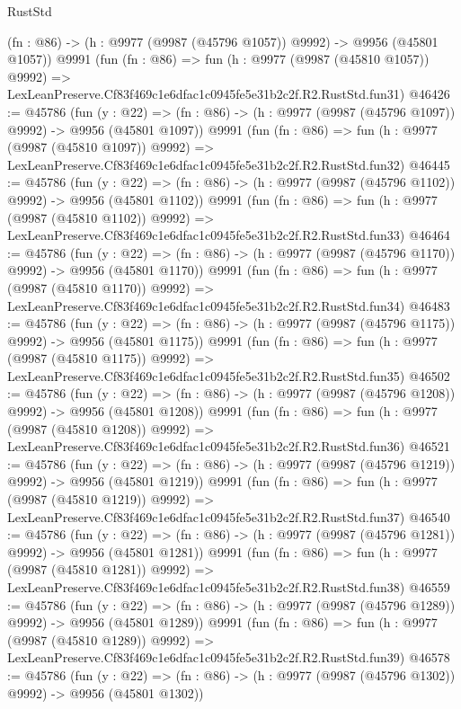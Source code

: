 \begin{lexlean}{RustStd}
\begin{coremodule}
    (fn : @86) -> (h : @9977 (@9987 (@45796 @1057)) @9992) -> @9956 (@45801 @1057))
    @9991
    (fun (fn : @86) =>
    fun (h : @9977 (@9987 (@45810 @1057)) @9992) =>
    LexLeanPreserve.Cf83f469c1e6dfac1c0945fe5e31b2c2f.R2.RustStd.fun31)
@46426 := @45786
    (fun (y : @22) =>
    (fn : @86) -> (h : @9977 (@9987 (@45796 @1097)) @9992) -> @9956 (@45801 @1097))
    @9991
    (fun (fn : @86) =>
    fun (h : @9977 (@9987 (@45810 @1097)) @9992) =>
    LexLeanPreserve.Cf83f469c1e6dfac1c0945fe5e31b2c2f.R2.RustStd.fun32)
@46445 := @45786
    (fun (y : @22) =>
    (fn : @86) -> (h : @9977 (@9987 (@45796 @1102)) @9992) -> @9956 (@45801 @1102))
    @9991
    (fun (fn : @86) =>
    fun (h : @9977 (@9987 (@45810 @1102)) @9992) =>
    LexLeanPreserve.Cf83f469c1e6dfac1c0945fe5e31b2c2f.R2.RustStd.fun33)
@46464 := @45786
    (fun (y : @22) =>
    (fn : @86) -> (h : @9977 (@9987 (@45796 @1170)) @9992) -> @9956 (@45801 @1170))
    @9991
    (fun (fn : @86) =>
    fun (h : @9977 (@9987 (@45810 @1170)) @9992) =>
    LexLeanPreserve.Cf83f469c1e6dfac1c0945fe5e31b2c2f.R2.RustStd.fun34)
@46483 := @45786
    (fun (y : @22) =>
    (fn : @86) -> (h : @9977 (@9987 (@45796 @1175)) @9992) -> @9956 (@45801 @1175))
    @9991
    (fun (fn : @86) =>
    fun (h : @9977 (@9987 (@45810 @1175)) @9992) =>
    LexLeanPreserve.Cf83f469c1e6dfac1c0945fe5e31b2c2f.R2.RustStd.fun35)
@46502 := @45786
    (fun (y : @22) =>
    (fn : @86) -> (h : @9977 (@9987 (@45796 @1208)) @9992) -> @9956 (@45801 @1208))
    @9991
    (fun (fn : @86) =>
    fun (h : @9977 (@9987 (@45810 @1208)) @9992) =>
    LexLeanPreserve.Cf83f469c1e6dfac1c0945fe5e31b2c2f.R2.RustStd.fun36)
@46521 := @45786
    (fun (y : @22) =>
    (fn : @86) -> (h : @9977 (@9987 (@45796 @1219)) @9992) -> @9956 (@45801 @1219))
    @9991
    (fun (fn : @86) =>
    fun (h : @9977 (@9987 (@45810 @1219)) @9992) =>
    LexLeanPreserve.Cf83f469c1e6dfac1c0945fe5e31b2c2f.R2.RustStd.fun37)
@46540 := @45786
    (fun (y : @22) =>
    (fn : @86) -> (h : @9977 (@9987 (@45796 @1281)) @9992) -> @9956 (@45801 @1281))
    @9991
    (fun (fn : @86) =>
    fun (h : @9977 (@9987 (@45810 @1281)) @9992) =>
    LexLeanPreserve.Cf83f469c1e6dfac1c0945fe5e31b2c2f.R2.RustStd.fun38)
@46559 := @45786
    (fun (y : @22) =>
    (fn : @86) -> (h : @9977 (@9987 (@45796 @1289)) @9992) -> @9956 (@45801 @1289))
    @9991
    (fun (fn : @86) =>
    fun (h : @9977 (@9987 (@45810 @1289)) @9992) =>
    LexLeanPreserve.Cf83f469c1e6dfac1c0945fe5e31b2c2f.R2.RustStd.fun39)
@46578 := @45786
    (fun (y : @22) =>
    (fn : @86) -> (h : @9977 (@9987 (@45796 @1302)) @9992) -> @9956 (@45801 @1302))

\end{coremodule}
\end{lexlean}
